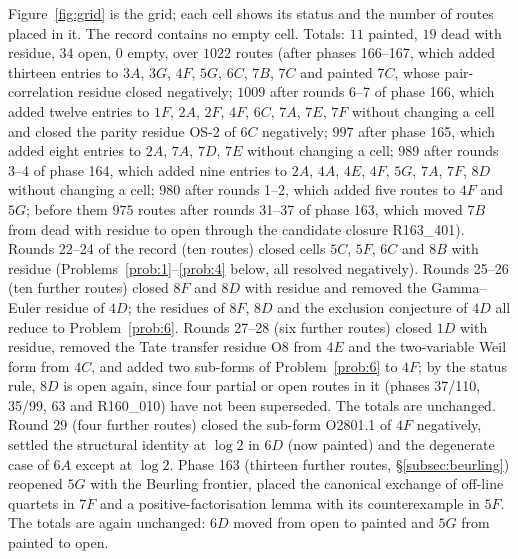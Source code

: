 \documentclass[11pt]{amsart}
\theoremstyle{definition}
\theoremstyle{remark}
\begin{document}
Figure~\ref{fig:grid} is the grid; each cell shows its status and the number of routes placed in it.
The record contains no empty cell. Totals: $11$ painted, $19$ dead with residue, $34$ open, $0$ empty, over $1022$ routes (after phases 166--167, which added thirteen entries to $3A$, $3G$, $4F$, $5G$, $6C$, $7B$, $7C$ and painted $7C$, whose pair-correlation residue closed negatively; $1009$ after rounds 6--7 of phase 166, which added twelve entries to $1F$, $2A$, $2F$, $4F$, $6C$, $7A$, $7E$, $7F$ without changing a cell and closed the parity residue OS-2 of $6C$ negatively; $997$ after phase 165, which added eight entries to $2A$, $7A$, $7D$, $7E$ without changing a cell; $989$ after rounds 3--4 of phase 164, which added nine entries to $2A$, $4A$, $4E$, $4F$, $5G$, $7A$, $7F$, $8D$ without changing a cell; $980$ after rounds 1--2, which added five routes to $4F$ and $5G$; before them $975$ routes after rounds 31--37 of phase 163, which moved $7B$ from dead with residue to open through the candidate closure R163\_401). Rounds 22--24 of the record (ten routes) closed cells $5C$, $5F$, $6C$ and $8B$ with residue (Problems~\ref{prob:1}--\ref{prob:4} below, all resolved negatively). Rounds 25--26 (ten further routes) closed $8F$ and $8D$ with residue and removed the Gamma--Euler residue of $4D$; the residues of $8F$, $8D$ and the exclusion conjecture of $4D$ all reduce to Problem~\ref{prob:6}. Rounds 27--28 (six further routes) closed $1D$ with residue, removed the Tate transfer residue O8 from $4E$ and the two-variable Weil form from $4C$, and added two sub-forms of Problem~\ref{prob:6} to $4F$; by the status rule, $8D$ is open again, since four partial or open routes in it (phases 37/110, 35/99, 63 and R160\_010) have not been superseded. The totals are unchanged. Round 29 (four further routes) closed the sub-form O2801.1 of $4F$ negatively, settled the structural identity at $\log2$ in $6D$ (now painted) and the degenerate case of $6A$ except at $\log2$. Phase 163 (thirteen further routes, \S\ref{subsec:beurling}) reopened $5G$ with the Beurling frontier, placed the canonical exchange of off-line quartets in $7F$ and a positive-factorisation lemma with its counterexample in $5F$. The totals are again unchanged: $6D$ moved from open to painted and $5G$ from painted to open.
\end{document}
